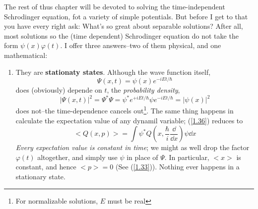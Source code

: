 The rest of thus chapter will be devoted to solving the time-independent Schrodinger equation, fot a variety of simple potentials. But before I get to that you have every right ask: What's so great about separable solutions? After all, most solutions so the (time dependent) Schrodinger equation do not take the form $\psi(x)\varphi(t)$. I offer three answers--two of them physical, and one mathematical:
\begin{enumerate}
	\item They are \textbf{stationaty states}. Although the wave function itself,
		\begin{equation}\label{2.7}
	\Psi(x,t)=\psi(x)e^{-iEt/\hbar}
\end{equation}
does (obviously) depende on $t$, the \textit{probability density},
\begin{equation}\label{2.8}
	|\Psi(x,t)|^2=\Psi^*\Psi=\psi^*e^{+iEt/\hbar}\psi e^{-iEt/\hbar}=|\psi(x)|^2
\end{equation}
does not--the time-dependence cancels out\footnote{For normalizable solutions, $E$ must be real}. The same thing happens in calculate the expectation value of any dynamil variable; (\ref{1.36}) reduces to
\begin{equation}\label{2.9}
	<Q(x,p)>=\int\psi^*Q\left(x,\frac{\hbar}{i}\frac{\dd}{\dd x}\right)\psi\dd x
\end{equation}
\textit{Every expectation value is constant in time}; we might as well drop the factor $\varphi(t)$ altogether, and simply use $\psi$ in place of $\Psi$. In particular, $<x>$ is constant, and hence $<p>=0$ (See (\ref{1.33})). Nothing ever happens in a stationary state.


\end{enumerate}
